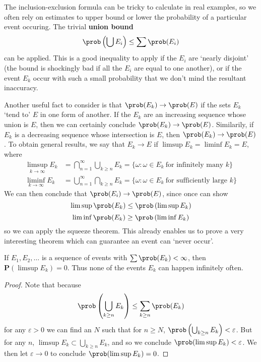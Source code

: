 The inclusion-exclusion formula can be tricky to calculate in real examples, so we often rely on estimates to upper bound or lower the probability of a particular event occuring. The trivial {\bf union bound}
%
\[ \prob \left( \bigcup E_i \right) \leq \sum \prob(E_i) \]
%
can be applied. This is a good inequality to apply if the $E_i$ are `nearly disjoint' (the bound is shockingly bad if all the $E_i$ are equal to one another), or if the event $E_k$ occur with such a small probability that we don't mind the resultant inaccuracy.

Another useful fact to consider is that $\prob(E_k) \to \prob(E)$ if the sets $E_k$ `tend to' $E$ in one form of another. If the $E_k$ are an increasing sequence whose union is $E$, then we can certainly conclude $\prob(E_k) \to \prob(E)$. Similarily, if $E_k$ is a decreasing sequence whose intersection is $E$, then $\prob(E_k) \to \prob(E)$. To obtain general results, we say that $E_k \to E$ if $\limsup E_k = \liminf E_k = E$, where
%
\begin{align*}
    \limsup_{k \to \infty} E_k &= \bigcap_{n = 1}^\infty \bigcup_{k \geq n} E_k = \{ \omega : \omega \in E_k\ \text{for infinitely many $k$} \}\\
    \liminf_{k \to \infty} E_k &= \bigcup_{n = 1}^\infty \bigcap_{k \geq n} E_k = \{ \omega: \omega \in E_k\ \text{for sufficiently large $k$} \}
\end{align*}
%
We can then conclude that $\prob(E_i) \to \prob(E)$, since once can show
%
\[ \limsup \prob(E_k) \leq \prob \left( \limsup E_k \right) \]
\[ \liminf \prob(E_k) \geq \prob \left( \liminf E_k \right) \]
%
so we can apply the squeeze theorem. This already enables us to prove a very interesting theorem which can guarantee an event can `never occur'.

\begin{lemma}
    If $E_1, E_2, \dots$ is a sequence of events with $\sum \prob(E_k) < \infty$, then $\mathbf{P} \left( \limsup E_k \right) = 0$. Thus none of the events $E_k$ can happen infinitely often.
\end{lemma}
\begin{proof}
    Note that because
    \[ \prob \left( \bigcup_{k \geq n} E_k \right) \leq \sum_{k \geq n} \prob(E_k) \]
    for any $\varepsilon > 0$ we can find an $N$ such that for $n \geq N$, $\prob \left( \bigcup_{k \geq n} E_k \right) < \varepsilon$. But for any $n$, $\limsup E_k \subset \bigcup_{k \geq n} E_k$, and so we conclude $\prob(\limsup E_k) < \varepsilon$. We then let $\varepsilon \to 0$ to conclude $\prob(\limsup E_k) = 0$.
\end{proof}

